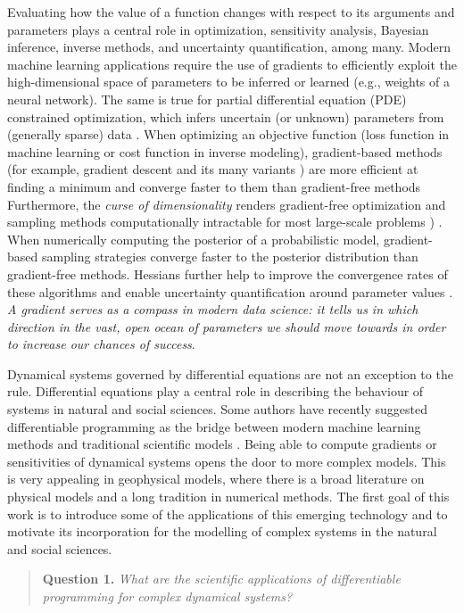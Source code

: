 Evaluating how the value of a function changes with respect to its arguments and parameters plays a central role in optimization, sensitivity analysis, Bayesian inference, inverse methods, and uncertainty quantification, among many\cite{Razavi.2021}. 
Modern machine learning applications require the use of gradients to efficiently exploit  the high-dimensional space of parameters to be inferred or learned (e.g., weights of a neural network). 
The same is true for partial differential equation (PDE) constrained optimization, which infers uncertain (or unknown) parameters from (generally sparse) data  \cite{Ghattas.2021}.
When optimizing an objective function (loss function in machine learning or cost function in inverse modeling), gradient-based methods (for example, gradient descent and its many variants \cite{ruder2016overview-gradient-descent}) are more efficient at finding a minimum and converge faster to them than gradient-free methods
Furthermore, the \textit{curse of dimensionality} renders gradient-free optimization and sampling methods computationally intractable for most large-scale problems \cite{Oden:2010tv})
.
When numerically computing the posterior of a probabilistic model, gradient-based sampling strategies converge faster to the posterior distribution than gradient-free methods. 
Hessians further help to improve the convergence rates of these algorithms and enable uncertainty quantification around parameter values \cite{BuiThanh:2012ul}.
\textit{A gradient serves as a compass in modern data science: it tells us in which direction in the vast, open ocean of parameters we should move towards in order to increase our chances of success}.  

Dynamical systems governed by differential equations are not an exception to the rule.
Differential equations play a central role in describing the behaviour of systems in natural and social sciences. 
Some authors have recently suggested differentiable programming as the bridge between modern machine learning methods and traditional scientific models \cite{Ramsundar_Krishnamurthy_Viswanathan_2021, Shen_diff_modelling, Gelbrecht-differential-programming-Earth}. 
Being able to compute gradients or sensitivities of dynamical systems opens the door to more complex models.
This is very appealing in geophysical models, where there is a broad literature on physical models and a long tradition in numerical methods. 
The first goal of this work is to introduce some of the applications of this emerging technology and to motivate its incorporation for the modelling of complex systems in the natural and social sciences. 
\begin{quote}
    \textbf{Question 1. }
    \textit{What are the scientific applications of differentiable programming for complex dynamical systems?}
\end{quote}

